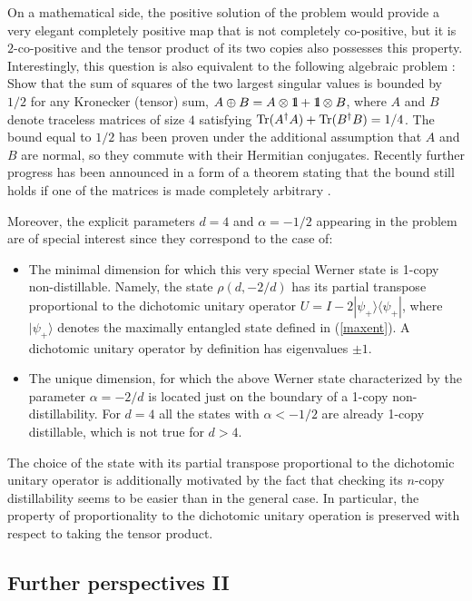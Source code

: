 \documentclass[english,aps,pra,nofootinbib,twocolumn,superscriptaddress]{revtex4-1}
\newcommand{\1}{{\rm 1\hspace{-0.9mm}l}}
\begin{document}
On a mathematical side, the positive solution of the problem would provide a very elegant completely positive map that is not completely co-positive, 
but it is $2$-co-positive and the tensor product of its two copies also possesses this property.  
Interestingly,  this question is also equivalent to the following algebraic problem \cite{Pankowski2010}:  Show that the sum of squares of the two largest singular
values is bounded by $1/2$ for
 any Kronecker (tensor)  sum, $A \oplus B= A \otimes \1 + \1 \otimes B$,
 where $A$ and $B$ denote  traceless matrices of size $4$  satisfying 
 ${\rm Tr}(A^{\dagger}A) + {\rm Tr}(B^{\dagger}B) =1/4$. 
The bound equal to $1/2$ has been proven
 \cite{Pankowski2010}
 under the additional assumption that $A$ and $B$ are normal,
 so they commute with their Hermitian conjugates. Recently 
 further progress has been announced in a form of a theorem stating that  
 the bound still holds if one of the matrices is made completely arbitrary 
 \cite{Progress2019}.

Moreover, the explicit parameters $d=4$ and $\alpha=-1/2$ appearing in the problem are of special interest
since they correspond to the case of:
 \begin{itemize}
\item[(i)] The minimal dimension for which this very special Werner state is 1-copy non-distillable. 
Namely, the state $\rho(d, -2/d)$ has its partial transpose proportional  
to the dichotomic unitary operator
$U=I - 2 |\psi_{+}\rangle \langle \psi_{+}|$, where 
$|\psi_+\rangle$
denotes the maximally entangled state defined in (\ref{maxent}).
A  dichotomic unitary operator by definition has eigenvalues $\pm 1$.
\item[(ii)] The unique dimension, for which the above Werner state characterized by the parameter  $\alpha=-2/d$ is located  just on the boundary 
of a 1-copy non-distillability. For $d=4$  all the states with $\alpha < - 1/2$ are already 1-copy distillable,
which is not true for $d > 4$.
\end{itemize}

The choice of  the state with its partial transpose proportional 
to the  dichotomic unitary  operator
 is additionally motivated by the fact  that  checking its $n$-copy distillability seems to be easier
 than in the general case.
  In particular, the property of proportionality to the dichotomic unitary operation 
 is preserved with respect to taking the tensor product. 
\medskip

\subsection{ Further perspectives II}
\end{document}
